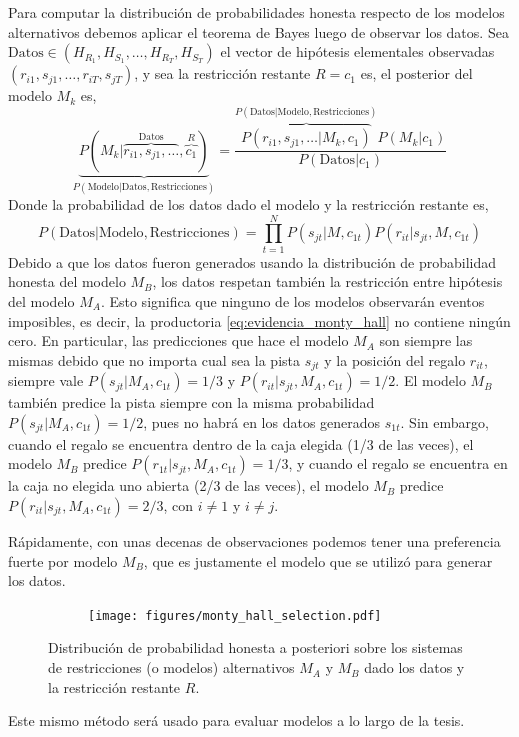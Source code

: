 \documentclass[a4paper,11pt]{book}
\theoremstyle{definition}
\begin{document}

Para computar la distribución de probabilidades honesta respecto de los modelos alternativos debemos aplicar el teorema de Bayes luego de observar los datos.
%
Sea $\text{Datos}\in (H_{R_1}, H_{S_1}, \dots, H_{R_T}, H_{S_T})$ el vector de hipótesis elementales observadas $(r_{i1}, s_{j1}, \dots, r_{iT}, s_{jT})$, y sea la restricción restante $R=c_1$ es, el posterior del modelo $M_k$ es,
%
\begin{equation}\label{eq:posterior_modelo_montyhall}
\underbrace{P(M_k|\overbrace{r_{i1},s_{j1}, \dots }^{\text{Datos}},\overbrace{c_1}^{R})}_{P(\text{Modelo}|\text{Datos},\text{Restricciones})} = \frac{\overbrace{P(r_{i1},s_{j1}, \dots |M_k,c_1)}^{P(\text{Datos}|\text{Modelo},\text{Restricciones})} P(M_k|c_1)}{P(\text{Datos}|c_1)}
\end{equation}
%
Donde la probabilidad de los datos dado el modelo y la restricción restante es,
%
\begin{equation} \label{eq:evidencia_monty_hall}
P(\text{Datos}|\text{Modelo},\text{Restricciones}) = \prod_{t=1}^N P(s_{jt}|M,c_{1t})P(r_{it}|s_{jt},M,c_{1t})
\end{equation}
%
Debido a que los datos fueron generados usando la distribución de probabilidad honesta del modelo $M_B$, los datos respetan también la restricción entre hipótesis del modelo $M_A$.
%
Esto significa que ninguno de los modelos observarán eventos imposibles, es decir, la productoria \eqref{eq:evidencia_monty_hall} no contiene ningún cero.
%
En particular, las predicciones que hace el modelo $M_A$ son siempre las mismas debido que no importa cual sea la pista $s_{jt}$ y la posición del regalo $r_{it}$, siempre vale $P(s_{jt}|M_A,c_{1t}) = 1/3$ y $P(r_{it}|s_{jt},M_A,c_{1t}) = 1/2$.
%
El modelo $M_B$ tambi\'en predice la pista siempre con la misma probabilidad $P(s_{jt}|M_A,c_{1t})=1/2$, pues no habr\'a en los datos generados $s_{1t}$.
%
Sin embargo, cuando el regalo se encuentra dentro de la caja elegida (1/3 de las veces), el modelo $M_B$ predice $P(r_{1t}|s_{jt},M_A,c_{1t}) = 1/3$, y cuando el regalo se encuentra en la caja no elegida uno abierta (2/3 de las veces), el modelo $M_B$ predice $P(r_{it}|s_{jt},M_A,c_{1t}) = 2/3$, con $i\neq1$ y $i\neq j$.


R\'apidamente, con unas decenas de observaciones podemos tener una preferencia fuerte por modelo $M_B$, que es justamente el modelo que se utilizó para generar los datos.
%
\begin{figure}[H]
    \centering
    \begin{subfigure}[b]{0.45\textwidth}
    \texttt{[image: figures/monty\_hall\_selection.pdf]}
    \end{subfigure}
    \caption{
    Distribución de probabilidad honesta a posteriori sobre los sistemas de restricciones (o modelos) alternativos $M_A$ y $M_B$ dado los datos y la restricción restante $R$.
    }
    \label{fig:monty_hall_selection}
\end{figure}
%
Este mismo m\'etodo ser\'a usado para evaluar modelos a lo largo de la tesis.
\end{document}
